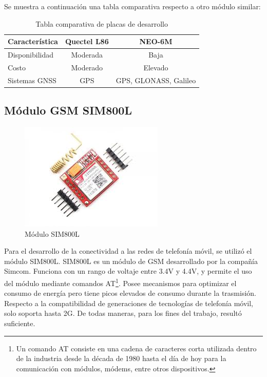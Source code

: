 Se muestra a continuación una tabla comparativa respecto a otro módulo similar:

\begin{table}[h]
	\centering
	\caption[Tabla comparativa]{Tabla comparativa de placas de desarrollo}
	\begin{tabular}{l c c}    
		\toprule
		\textbf{Característica} 	 & \textbf{Quectel L86} & \textbf{NEO-6M} \\
		\midrule
		Disponibilidad & Moderada & Baja			\\		
		Costo & Moderado & Elevado			\\
		Sistemas GNSS & GPS & GPS, GLONASS, Galileo		\\
		\bottomrule
		\hline
	\end{tabular}
	\label{tab:peces}
\end{table}

\subsection{Módulo GSM SIM800L}

\begin{figure}[H]
	\centering
	\includegraphics[width=.6\textwidth]{./Figures/sim800l.jpg}
	\caption{Módulo SIM800L}
	\label{fig:texmaker}
\end{figure}

Para el desarrollo de la conectividad a las redes de telefonía móvil, se utilizó el módulo SIM800L. SIM800L es un módulo de GSM desarrollado por la compañía Simcom. Funciona con un rango de voltaje entre 3.4V y 4.4V, y permite el uso del módulo mediante comandos AT\footnote{Un comando AT consiste en una cadena de caracteres corta utilizada dentro de la industria desde la década de 1980 hasta el día de hoy para la comunicación con módulos, módems, entre otros dispositivos{\citep{AT:1}.}}. Posee mecanismos para optimizar el consumo de energía pero tiene picos elevados de consumo durante la trasmisión. Respecto a la compatibilidad de generaciones de tecnologías de telefonía móvil, solo soporta hasta 2G\citep{SIM800L:1}. De todas maneras, para los fines del trabajo, resultó suficiente.

